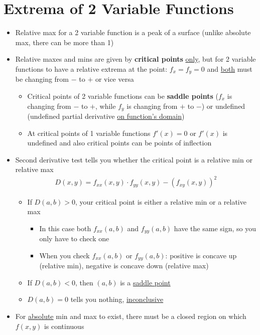 \documentclass{article}
\begin{document}
\section{Extrema of 2 Variable Functions}
\begin{itemize}
  \item Relative max for a 2 variable function is a peak of a surface (unlike absolute max, there can be more than 1)
  \item Relative maxes and mins are given by \textbf{critical points} \underline{only}, but for 2 variable functions to have a relative extrema at the point: $f_x = f_y = 0$ and \underline{both} must be changing from $-$ to $+$ or vice versa
  \begin{itemize}
    \item Critical points of 2 variable functions can be \textbf{saddle points} ($f_x$ is changing from $-$ to $+$, while $f_y$ is changing from $+$ to $-$) or undefined (undefined partial derivative \underline{on function's domain})
    \item At critical points of 1 variable functions $f'(x) = 0$ or $f'(x)$ is undefined and also critical points can be points of inflection
    \end{itemize}
  \item Second derivative test tells you whether the critical point is a relative min or relative max
  \begin{align}
    D(x,y) = f_{xx}(x,y)\cdot f_{yy}(x,y) - (f_{xy}(x,y))^2
  \end{align}
  \begin{itemize}
    \item If $D(a,b) > 0$, your critical point is either a relative min or a relative max
    \begin{itemize}
      \item In this case both $f_{xx}(a,b)$ and $f_{yy}(a,b)$ have the same sign, so you only have to check one
      \item When you check $f_{xx}(a,b)$ or $f_{yy}(a,b)$: positive is concave up (relative min), negative is concave down (relative max)
    \end{itemize}
      \item If $D(a,b) < 0$, then $(a,b)$ is a \underline{saddle point}
      \item $D(a,b) = 0$ tells you nothing, \underline{inconclusive}
    \end{itemize}
  \item For \underline{absolute} min and max to exist, there must be a closed region on which $f(x,y)$ is continuous

\end{itemize}
\end{document}
